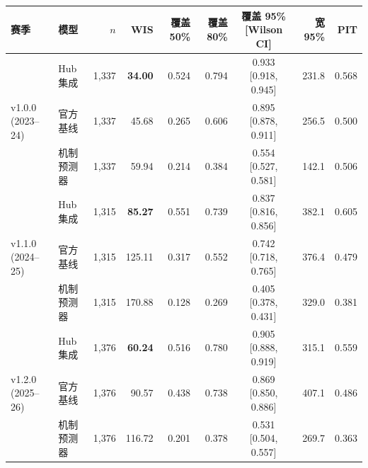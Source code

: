 \begin{tabular}{@{}llrrrrcrr@{}}
\toprule
赛季 & 模型 & $n$ & WIS & 覆盖 50\% & 覆盖 80\% & 覆盖 95\% [Wilson CI] & 宽 95\% & PIT \\
\midrule
\multirow{3}{*}{v1.0.0 (2023--24)}
& Hub 集成 & 1,337 & \textbf{34.00} & 0.524 & 0.794 & 0.933 [0.918, 0.945] & 231.8 & 0.568 \\
& 官方基线 & 1,337 & 45.68 & 0.265 & 0.606 & 0.895 [0.878, 0.911] & 256.5 & 0.500 \\
& 机制预测器 & 1,337 & 59.94 & 0.214 & 0.384 & 0.554 [0.527, 0.581] & 142.1 & 0.506 \\
\midrule
\multirow{3}{*}{v1.1.0 (2024--25)}
& Hub 集成 & 1,315 & \textbf{85.27} & 0.551 & 0.739 & 0.837 [0.816, 0.856] & 382.1 & 0.605 \\
& 官方基线 & 1,315 & 125.11 & 0.317 & 0.552 & 0.742 [0.718, 0.765] & 376.4 & 0.479 \\
& 机制预测器 & 1,315 & 170.88 & 0.128 & 0.269 & 0.405 [0.378, 0.431] & 329.0 & 0.381 \\
\midrule
\multirow{3}{*}{v1.2.0 (2025--26)}
& Hub 集成 & 1,376 & \textbf{60.24} & 0.516 & 0.780 & 0.905 [0.888, 0.919] & 315.1 & 0.559 \\
& 官方基线 & 1,376 & 90.57 & 0.438 & 0.738 & 0.869 [0.850, 0.886] & 407.1 & 0.486 \\
& 机制预测器 & 1,376 & 116.72 & 0.201 & 0.378 & 0.531 [0.504, 0.557] & 269.7 & 0.363 \\
\bottomrule
\end{tabular}